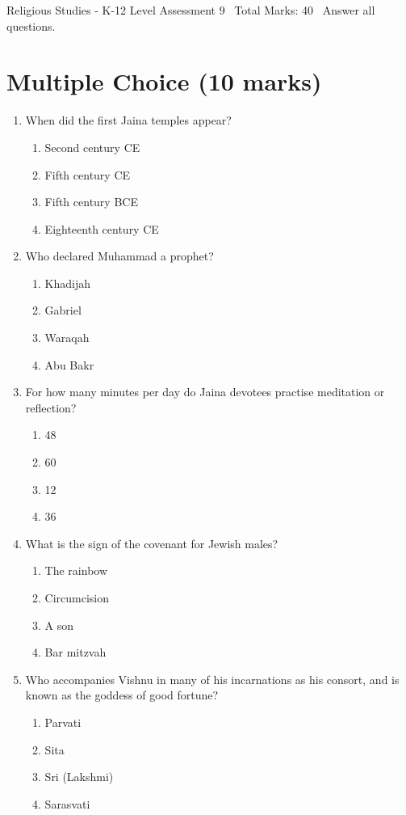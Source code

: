 \documentclass[12pt]{article}
\begin{document}
\begin{center}
Religious Studies - K-12 Level Assessment 9 \
Total Marks: 40 \
Answer all questions.
\end{center}

\section*{Multiple Choice (10 marks)}
\begin{enumerate}[label=\arabic*.]
\item When did the first Jaina temples appear?
\begin{enumerate}[label=(\alph*)]
    \item Second century CE
    \item Fifth century CE
    \item Fifth century BCE
    \item Eighteenth century CE
\end{enumerate}
\item Who declared Muhammad a prophet?
\begin{enumerate}[label=(\alph*)]
    \item Khadijah
    \item Gabriel
    \item Waraqah
    \item Abu Bakr
\end{enumerate}
\item For how many minutes per day do Jaina devotees practise meditation or reflection?
\begin{enumerate}[label=(\alph*)]
    \item 48
    \item 60
    \item 12
    \item 36
\end{enumerate}
\item What is the sign of the covenant for Jewish males?
\begin{enumerate}[label=(\alph*)]
    \item The rainbow
    \item Circumcision
    \item A son
    \item Bar mitzvah
\end{enumerate}
\item Who accompanies Vishnu in many of his incarnations as his consort, and is known as the goddess of good fortune?
\begin{enumerate}[label=(\alph*)]
    \item Parvati
    \item Sita
    \item Sri (Lakshmi)
    \item Sarasvati
\end{enumerate}
\end{enumerate}
\end{document}
